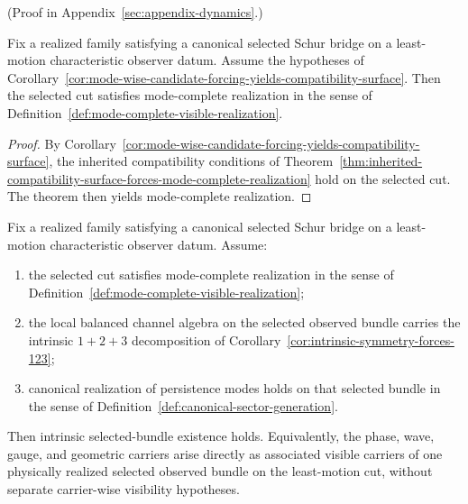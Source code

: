 (Proof in Appendix~\ref{sec:appendix-dynamics}.)

\begin{corollary}
\label{cor:mode-wise-candidate-forcing-yields-mode-complete-realization}
Fix a realized family satisfying a canonical selected Schur bridge on a
least-motion characteristic observer datum. Assume the hypotheses of
Corollary~\ref{cor:mode-wise-candidate-forcing-yields-compatibility-surface}.
Then the selected cut satisfies mode-complete realization in
the sense of Definition~\ref{def:mode-complete-visible-realization}.
\end{corollary}

\begin{proof}
By
Corollary~\ref{cor:mode-wise-candidate-forcing-yields-compatibility-surface},
the inherited compatibility conditions of
Theorem~\ref{thm:inherited-compatibility-surface-forces-mode-complete-realization}
hold on the selected cut. The theorem then yields mode-complete
realization.
\end{proof}

\begin{theorem}
\label{thm:mode-complete-realization-forces-intrinsic-selected-bundle}
Fix a realized family satisfying a canonical selected Schur bridge on a
least-motion characteristic observer datum. Assume:
\begin{enumerate}[label=(\roman*), leftmargin=2em, itemsep=0.2em]
\item the selected cut satisfies mode-complete realization in
      the sense of Definition~\ref{def:mode-complete-visible-realization};
\item the local balanced channel algebra on the selected observed bundle
      carries the intrinsic \(1+2+3\) decomposition of
      Corollary~\ref{cor:intrinsic-symmetry-forces-123};
\item canonical realization of persistence modes holds on that selected bundle
      in the sense of Definition~\ref{def:canonical-sector-generation}.
\end{enumerate}
Then intrinsic selected-bundle existence holds. Equivalently, the phase, wave,
gauge, and geometric carriers arise directly as associated visible carriers of
one physically realized selected observed bundle on the least-motion cut,
without separate carrier-wise visibility hypotheses.
\end{theorem}

